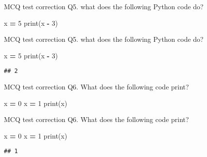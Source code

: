 \documentclass[
  8pt,
  ignorenonframetext,
]{beamer}
\newenvironment{Shaded}{\begin{snugshade}}{\end{snugshade}}
\newcommand{\BuiltInTok}[1]{#1}
\newcommand{\DecValTok}[1]{\textcolor[rgb]{0.00,0.00,0.81}{#1}}
\newcommand{\NormalTok}[1]{#1}
\newcommand{\OperatorTok}[1]{\textcolor[rgb]{0.81,0.36,0.00}{\textbf{#1}}}
\begin{document}
\begin{frame}[fragile]{MCQ test correction}
\protect\hypertarget{mcq-test-correction-8}{}
Q5. what does the following Python code do?

\begin{Shaded}
\begin{Highlighting}[]
\NormalTok{x }\OperatorTok{=} \DecValTok{5}
\BuiltInTok{print}\NormalTok{(x }\OperatorTok{{-}} \DecValTok{3}\NormalTok{)}
\end{Highlighting}
\end{Shaded}
\end{frame}

\begin{frame}[fragile]{MCQ test correction}
\protect\hypertarget{mcq-test-correction-9}{}
Q5. what does the following Python code do?

\begin{Shaded}
\begin{Highlighting}[]
\NormalTok{x }\OperatorTok{=} \DecValTok{5}
\BuiltInTok{print}\NormalTok{(x }\OperatorTok{{-}} \DecValTok{3}\NormalTok{)}
\end{Highlighting}
\end{Shaded}

\begin{verbatim}
## 2
\end{verbatim}
\end{frame}

\begin{frame}[fragile]{MCQ test correction}
\protect\hypertarget{mcq-test-correction-10}{}
Q6. What does the following code print?

\begin{Shaded}
\begin{Highlighting}[]
\NormalTok{x }\OperatorTok{=} \DecValTok{0}
\NormalTok{x }\OperatorTok{=} \DecValTok{1}
\BuiltInTok{print}\NormalTok{(x)}
\end{Highlighting}
\end{Shaded}
\end{frame}

\begin{frame}[fragile]{MCQ test correction}
\protect\hypertarget{mcq-test-correction-11}{}
Q6. What does the following code print?

\begin{Shaded}
\begin{Highlighting}[]
\NormalTok{x }\OperatorTok{=} \DecValTok{0}
\NormalTok{x }\OperatorTok{=} \DecValTok{1}
\BuiltInTok{print}\NormalTok{(x)}
\end{Highlighting}
\end{Shaded}

\begin{verbatim}
## 1
\end{verbatim}
\end{frame}
\end{document}
